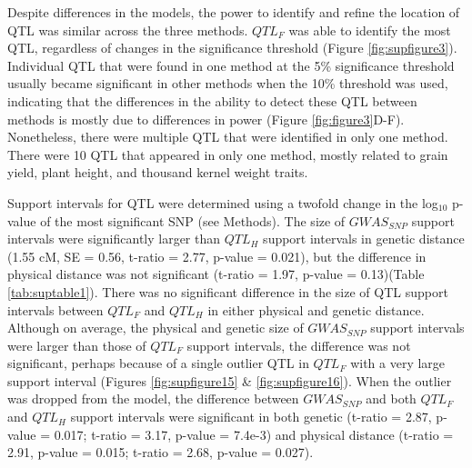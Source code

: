 \documentclass[9pt,twocolumn,twoside]{gsag3jnl}
\begin{document}
Despite differences in the models, the power to identify and refine the location of QTL was similar across the three methods.
$QTL_F$ was able to identify the most QTL, regardless of changes in the significance threshold (Figure \ref{fig:supfigure3}).
Individual QTL that were found in one method at the 5\% significance threshold usually became significant in other methods when the 10\% threshold was used, indicating that the differences in the ability to detect these QTL between methods is mostly due to differences in power (Figure \ref{fig:figure3}D-F).
Nonetheless, there were multiple QTL that were identified in only one method. There were 10 QTL that appeared in only one method, mostly related to grain yield, plant height, and thousand kernel weight traits.

Support intervals for QTL were determined using a twofold change in the log$_{10}$ p-value of the most significant SNP (see Methods).
The size of $GWAS_{SNP}$ support intervals were significantly larger than $QTL_H$ support intervals in genetic distance (1.55 cM, SE = 0.56, t-ratio = 2.77, p-value = 0.021), but the difference in physical distance was not significant (t-ratio = 1.97, p-value = 0.13)(Table \ref{tab:suptable1}).
There was no significant difference in the size of QTL support intervals between $QTL_F$ and $QTL_H$ in either physical and genetic distance.
Although on average, the physical and genetic size of $GWAS_{SNP}$ support intervals were larger than those of $QTL_F$ support intervals, the difference was not significant, perhaps because of a single outlier QTL in $QTL_F$ with a very large support interval (Figures \ref{fig:supfigure15} \& \ref{fig:supfigure16}).
When the outlier was dropped from the model, the difference between $GWAS_{SNP}$ and both $QTL_F$ and $QTL_H$ support intervals were significant in both genetic (t-ratio = 2.87, p-value = 0.017; t-ratio = 3.17, p-value = 7.4e-3) and physical distance (t-ratio = 2.91, p-value = 0.015; t-ratio = 2.68, p-value = 0.027).
\end{document}
